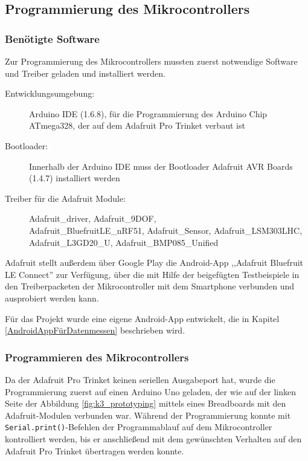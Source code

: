 \subsection{Programmierung des Mikrocontrollers}
\label{kapitel_programmierungMikrocontroller}
 
\subsubsection{Benötigte Software}

Zur Programmierung des Mikrocontrollers mussten zuerst notwendige Software und Treiber geladen und installiert werden.

\begin{description}
	\item[Entwicklungsumgebung:] Arduino IDE (1.6.8), für die Programmierung des Arduino Chip ATmega328, der auf dem Adafruit Pro Trinket verbaut ist
	\item[Bootloader:] Innerhalb der Arduino IDE muss der Bootloader Adafruit AVR Boards (1.4.7) installiert werden
	\item[Treiber für die Adafruit Module:] Adafruit\_driver, Adafruit\_9DOF, \\ Adafruit\_BluefruitLE\_nRF51, Adafruit\_Sensor, Adafruit\_LSM303LHC, \\ Adafruit\_L3GD20\_U, Adafruit\_BMP085\_Unified
\end{description}

Adafruit stellt außerdem über Google Play die Android-App ,,Adafruit Bluefruit LE Connect'' zur Verfügung, über die mit Hilfe der beigefügten Testbeispiele in den Treiberpacketen der Mikrocontroller mit dem Smartphone verbunden und ausprobiert werden kann. 

Für das Projekt wurde eine eigene Android-App entwickelt, die in Kapitel \ref{AndroidAppFürDatenmessen} beschrieben wird.

\subsubsection{Programmieren des Mikrocontrollers}
Da der Adafruit Pro Trinket keinen seriellen Ausgabeport hat, wurde die Programmierung zuerst auf einen Arduino Uno geladen, der wie auf der linken Seite der Abbildung \ref{fig:k3_prototyping} mittels eines Breadboards mit den Adafruit-Modulen verbunden war. Während der Programmierung konnte mit \texttt{Serial.print()}-Befehlen der Programmablauf auf dem Mikrocontroller kontrolliert werden, bis er anschließend mit dem gewünschten Verhalten auf den Adafruit Pro Trinket übertragen werden konnte.

